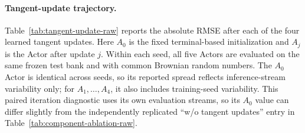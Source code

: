 \begin{table}[t]
\centering
\caption{Absolute whole-function value RMSE underlying the component-ablation
figure at $d=100$. Values are mean $\pm$ sample standard deviation. The
$\dagger$ entries summarize two independent inference replicates rather than
training seeds.}
\label{tab:component-ablation-raw}
\end{table}

\paragraph{Tangent-update trajectory.}
Table~\ref{tab:tangent-update-raw} reports the absolute RMSE after each of the
four learned tangent updates.  Here $A_0$ is the fixed terminal-based
initialization and $A_j$ is the Actor after update $j$.  Within each seed, all
five Actors are evaluated on the same frozen test bank and with common
Brownian random numbers.  The $A_0$ Actor is identical across seeds, so its
reported spread reflects inference-stream variability only; for
$A_1,\ldots,A_4$, it also includes training-seed variability.  This paired
iteration diagnostic uses its own evaluation streams, so its $A_0$ value can
differ slightly from the independently replicated ``w/o tangent updates''
entry in Table~\ref{tab:component-ablation-raw}.

